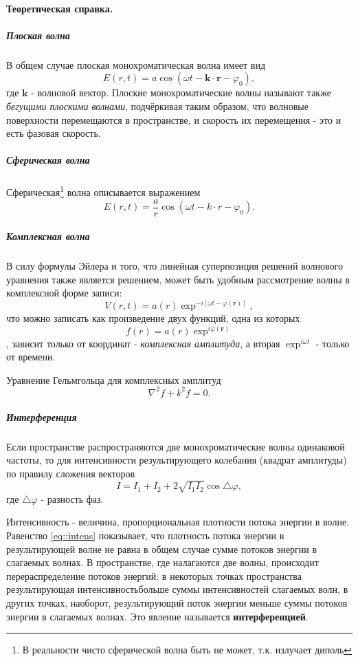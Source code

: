 \documentclass[12pt]{article}
\renewcommand{\phi}{\ensuremath{\varphi}}
\begin{document}
		\paragraph{Теоретическая справка.}
		\subparagraph{Плоская волна}
		В общем случае плоская монохроматическая волна имеет вид 
		\begin{equation}
			E(r,t) = a\cos(\omega t - \boldsymbol{k}\cdot\boldsymbol{r} - \phi_0),
		\end{equation}
		где $\boldsymbol{k}$ - волновой вектор. Плоские монохроматические волны называют также \textit{бегущими
		плоскими волнами}, подчёркивая таким образом, что волновые поверхности перемещаются в пространстве, и скорость их перемещения - это и есть фазовая скорость.
		\subparagraph{Сферическая волна}
		Сферическая\footnote{В реальности чисто сферической волна быть не может, т.к. излучает диполь} волна описывается выражением
		\begin{equation}
		E(r,t) = \dfrac{a}{r}\cos(\omega t - k\cdot r - \phi_0).
		\end{equation}
		\subparagraph{Комплексная волна}
		В силу формулы Эйлера и того, что линейная суперпозиция решений волнового уравнения также является решением, может быть удобным рассмотрение волны в комплексной форме записи:
		\begin{equation}
		V(r,t) = a(r)\exp^{-i\left[\omega t - \phi(\boldsymbol{r}) \right]},
		\end{equation} 
		что можно записать как произведение двух функций, одна из которых
		\begin{equation}
		f(r) = a(r)\exp^{i\phi(\boldsymbol{r})}
		\end{equation}, зависит только от координат - \textit{комплексная амплитуда}, а вторая $\exp^{i\omega t}$ - только от времени.
		
		Уравнение Гельмгольца для комплексных амплитуд 
		\begin{equation}
		\nabla^2f + k^2f = 0.
		\end{equation}
		
		\subparagraph{Интерференция}
		Если пространстве распространяются две монохроматические волны одинаковой частоты, то для интенсивности результирующего колебания (квадрат амплитуды) по правилу сложения векторов
		\begin{equation}\label{eq::intens}
		I = I_1 + I_2 + 2\sqrt{I_1I_2}\cos\triangle\phi,
		\end{equation}
		где $\triangle\phi$ - разность фаз.
		
		Интенсивность - величина,
		пропорциональная плотности потока энергии в
		волне. Равенство \eqref{eq::intens} показывает, что плотность потока энергии в результирующей волне
		не равна в общем случае сумме потоков энергии в слагаемых волнах. В пространстве, где
		налагаются две волны, происходит перераспределение потоков энергий: в некоторых точках
		пространства результирующая интенсивностьбольше суммы интенсивностей слагаемых волн, в других точках, наоборот, результирующий поток энергии меньше суммы потоков энергии в слагаемых
		волнах. Это явление называется \textbf{интерференцией}.
		
\end{document}
